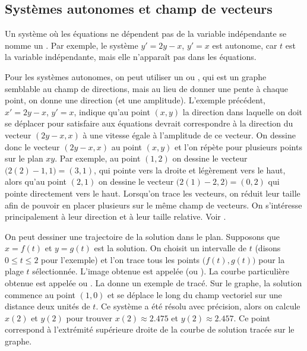 \subsection{Systèmes autonomes et champ de vecteurs}

Un système où les équations ne dépendent pas de la variable indépendante se nomme un  \emph{}.  Par exemple, le système $y'=2y-x$, $y'=x$ est autonome, car $t$ est la variable indépendante, mais elle n’apparaît pas dans les équations.

Pour les systèmes autonomes, on peut utiliser un
\emph{} ou \emph{},
qui est un graphe semblable au champ de directions, mais au lieu de donner une pente à chaque point, on donne une direction (et une amplitude). L’exemple précédent, $x' = 2y-x$, $y' = x$, indique qu’au point $(x,y)$ la direction dans laquelle on doit se déplacer pour satisfaire aux équations devrait correspondre à la direction du vecteur $( 2y-x, x )$
à une vitesse égale à l'amplitude de ce vecteur. On dessine donc le vecteur $(2y-x,x)$ au point $(x,y)$ et l'on répète pour plusieurs points sur le plan $xy$.
Par exemple, au point $(1,2)$ on dessine le vecteur
$\bigl(2(2)-1,1\bigr) = (3,1)$,
qui pointe vers la droite et légèrement vers le haut, alors qu’au point $(2,1)$ on dessine le vecteur $\bigl(2(1)-2,2\bigr) = (0,2)$
qui pointe directement vers le haut.
Lorsqu’on trace les vecteurs, on réduit leur taille afin de pouvoir en placer plusieurs sur le même champ de vecteurs. On s’intéresse principalement à leur direction et à leur taille relative.  Voir
.

On peut dessiner une trajectoire de la solution dans le plan. Supposons que $x = f(t)$ et $y=g(t)$ est la solution.  On choisit un intervalle de $t$ (disons $0 \leq t \leq 2$ pour l’exemple) et l'on trace tous les points
$\bigl(f(t),g(t)\bigr)$ pour la plage $t$ sélectionnée. L’image obtenue est appelée \emph{}
(ou ).
La courbe particulière obtenue est appelée \emph{} ou \emph{}.
La  donne un exemple de tracé.
Sur le graphe, la solution commence au point $(1,0)$ et se déplace le long du champ vectoriel sur une distance deux unités de $t$.  Ce système a été résolu avec précision, alors on calcule $x(2)$ et $y(2)$ pour trouver
$x(2) \approx 2.475$ et $y(2) \approx 2.457$.  Ce point correspond à l’extrémité supérieure droite de la courbe de solution tracée sur le graphe.

